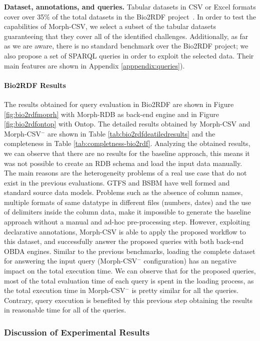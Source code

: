 \noindent\textbf{Dataset, annotations, and queries.} Tabular datasets in  CSV or Excel formats cover over 35\% of the total datasets in the Bio2RDF project~\citep{iglesias2019enhancing}. In order to test the capabilities of Morph-CSV, we select a subset of the tabular datasets guaranteeing that they cover all of the identified challenges. Additionally, as far as we are aware, there is no standard benchmark over the Bio2RDF project; we also propose a set of SPARQL queries in order to exploit the selected data. Their main features are shown in Appendix \ref{apppendix:queries}). 


\noindent\paragraph*{\textbf{Bio2RDF Results}}
The results obtained for query evaluation in Bio2RDF are shown in Figure \ref{fig:bio2rdfmoprh} with Morph-RDB as back-end engine and in Figure \ref{fig:bio2rdfontop} with Ontop. The detailed results obtained by Morph-CSV and Morph-CSV$^-$ are shown in Table \ref{tab:bio2rdfdeatiledresults} and the completeness in Table \ref{tab:completness-bio2rdf}. Analyzing the obtained results, we can observe that there are no results for the baseline approach, this means it was not possible to create an RDB schema and load the input data manually. The main reasons are the heterogeneity problems of a real use case that do not exist in the previous evaluations. GTFS and BSBM have well formed and standard source data models. Problems such as the absence of column names, multiple formats of same datatype in different files (numbers, dates) and the use of delimiters inside the column data, make it impossible to generate the baseline approach without a manual and ad-hoc pre-processing step. However, exploiting declarative annotations, Morph-CSV is able to apply the proposed workflow to this dataset, and successfully answer the proposed queries with both back-end OBDA engines. Similar to the previous benchmarks, loading the complete dataset for answering the input query (Morph-CSV$^-$ configuration) has an negative impact on the total execution time. We can observe that for the proposed queries, most of the total evaluation time of each query is spent in the loading process, as the total execution time in Morph-CSV$^-$ is pretty similar for all the queries. Contrary, query execution is benefited by this previous step obtaining the results in reasonable time for all of the queries. 


\subsubsection{Discussion of Experimental Results}

